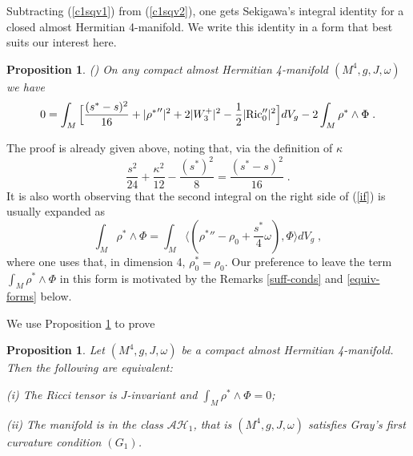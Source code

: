 \documentclass{amsart}
\newtheorem{prop}[theorem]{Proposition}
\begin{document}
\noindent
Subtracting (\ref{c1sqv1}) from (\ref{c1sqv2}), one gets Sekigawa's integral identity for a closed almost Hermitian 4-manifold. We write this identity in a form that best suits our interest here.
\begin{prop} \label{if-prop} (\cite{Sek87})
On any compact almost Hermitian 4-manifold $(M^4, g, J, \omega)$ we have
\begin{equation} \label{if}
0 = \int_M \Big[ \frac{(s^* - s)^2}{16} + |{\rho^*}''|^2 + 2 |W_3^+|^2 - \frac{1}{2} |{\rm Ric}_0''|^2 \Big] dV_g - 
2 \int_M \rho^* \wedge \Phi \; .
\end{equation}
\end{prop}
\noindent
The proof is already given above, noting that, via the definition of $\kappa$
$$ \frac{s^2}{24} + \frac{\kappa^2}{12} - \frac{(s^*)^2}{8} = \frac{(s^* - s)^2}{16} \; .$$
It is also worth observing that the second integral on the right side of (\ref{if}) is usually expanded as
$$\int_M \rho^* \wedge \Phi =  \int_M \langle ({\rho^*}'' - \rho_0 + \frac{s^*}{4} \omega), \Phi \rangle dV_g\; ,$$
where one uses that, in dimension 4, $\rho^*_0 = \rho_0$. Our preference to leave the term
$ \displaystyle{ \int_M \rho^* \wedge \Phi }$ in this form is motivated by the Remarks \ref{suff-conds} and \ref{equiv-forms} below.   

\vspace{0.2cm}

\noindent We use Proposition \ref{if-prop} to prove
\begin{prop} \label{ah1}
Let $(M^4, g, J, \omega)$ be a compact almost Hermitian 4-manifold. Then the following are equivalent:

(i) The Ricci tensor is $J$-invariant and $\displaystyle{\int_M \rho^* \wedge \Phi = 0}$;
 
(ii) The manifold is in the class $\mathcal{AH}_1$, that is $(M^4, g, J, \omega)$ satisfies Gray's first curvature condition $(G_1)$.
\end{prop}
\end{document}
